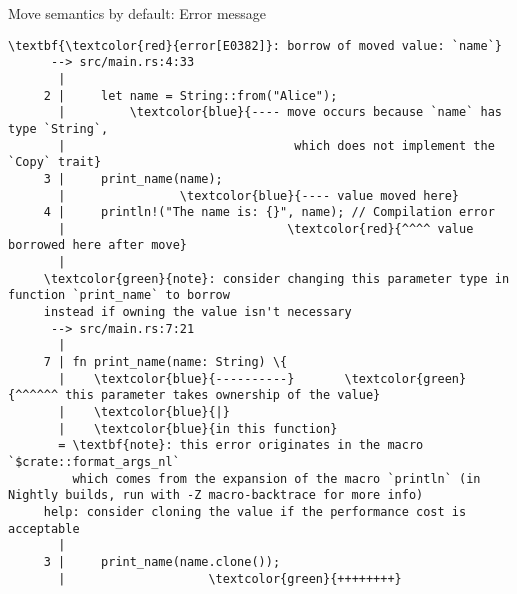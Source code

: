 \documentclass{beamer}
\begin{document}
\begin{frame}[fragile]{Move semantics by default: Error message}
  \begin{listing}
    \raggedleft
    \tiny
    \begin{Verbatim}[commandchars=\\\{\}]
      \textbf{\textcolor{red}{error[E0382]}: borrow of moved value: `name`}
      --> src/main.rs:4:33
       |
     2 |     let name = String::from("Alice");
       |         \textcolor{blue}{---- move occurs because `name` has type `String`,
       |                                which does not implement the `Copy` trait}
     3 |     print_name(name);
       |                \textcolor{blue}{---- value moved here}
     4 |     println!("The name is: {}", name); // Compilation error
       |                               \textcolor{red}{^^^^ value borrowed here after move}
       |
     \textcolor{green}{note}: consider changing this parameter type in function `print_name` to borrow
     instead if owning the value isn't necessary
      --> src/main.rs:7:21
       |
     7 | fn print_name(name: String) \{
       |    \textcolor{blue}{----------}       \textcolor{green}{^^^^^^ this parameter takes ownership of the value}
       |    \textcolor{blue}{|}
       |    \textcolor{blue}{in this function}
       = \textbf{note}: this error originates in the macro `$crate::format_args_nl`
         which comes from the expansion of the macro `println` (in Nightly builds, run with -Z macro-backtrace for more info)
     help: consider cloning the value if the performance cost is acceptable
       |
     3 |     print_name(name.clone());
       |                    \textcolor{green}{++++++++}     
    \end{Verbatim}
  \end{listing}
\end{frame}
\end{document}
